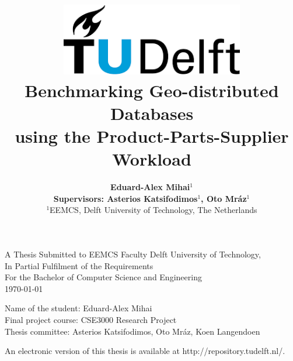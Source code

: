 \title{
    \includegraphics[width=8cm, keepaspectratio]{tudelftlogo.png}\\
    \vspace*{2cm}
    \textbf{
         Benchmarking Geo-distributed Databases \\
         using the Product-Parts-Supplier Workload
    }\\
    \vspace*{1cm}
}

\author{
    \textbf{Eduard-Alex Mihai$^1$}\\
    \hfill \break
    \textbf{Supervisors: Asterios Katsifodimos$^1$, Oto Mráz$^1$}\\
    \break
    {\large 
        \hfill \break
        $^1$EEMCS, Delft University of Technology, The Netherlands
    }\\
}

\date{}

\maketitle
\thispagestyle{empty}

\let\clearpagebackup\clearpage
\renewcommand{\clearpage}{ }

\onecolumn

\vspace*{1.5cm}
\begin{center}
    A Thesis Submitted to EEMCS Faculty Delft University of Technology,\\
    In Partial Fulfilment of the Requirements\\
    For the Bachelor of Computer Science and Engineering\\
    \today
\end{center}

\vspace*{2cm}

\noindent
{\small
Name of the student: Eduard-Alex Mihai \\
Final project course: CSE3000 Research Project\\
Thesis committee: Asterios Katsifodimos, Oto Mráz, Koen Langendoen\\
}
\vfill

\begin{center}
    An electronic version of this thesis is available at http://repository.tudelft.nl/.
\end{center}

\twocolumn
\let\clearpage\clearpagebackup  
\clearpage
\setcounter{page}{1}
